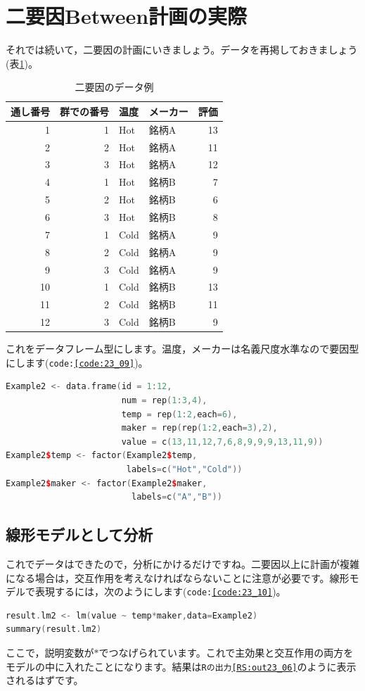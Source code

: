 \documentclass{ltjbook}
\begin{document}
\section{二要因Between計画の実際}
それでは続いて，二要因の計画にいきましょう。データを再掲しておきましょう(表\ref{tbl::23_02})。
\begin{table}[ht]
	\centering
	\caption{二要因のデータ例}
	\begin{tabular}{rrllr}
		\hline
		通し番号 & 群での番号 & 温度   & メーカー & 評価 \\
		\hline
		1    & 1     & Hot  & 銘柄A  & 13 \\
		2    & 2     & Hot  & 銘柄A  & 11 \\
		3    & 3     & Hot  & 銘柄A  & 12 \\
		4    & 1     & Hot  & 銘柄B  & 7  \\
		5    & 2     & Hot  & 銘柄B  & 6  \\
		6    & 3     & Hot  & 銘柄B  & 8  \\
		7    & 1     & Cold & 銘柄A  & 9  \\
		8    & 2     & Cold & 銘柄A  & 9  \\
		9    & 3     & Cold & 銘柄A  & 9  \\
		10   & 1     & Cold & 銘柄B  & 13 \\
		11   & 2     & Cold & 銘柄B  & 11 \\
		12   & 3     & Cold & 銘柄B  & 9  \\
		\hline
	\end{tabular}

	\label{tbl::23_02}
\end{table}
これをデータフレーム型にします。温度，メーカーは名義尺度水準なので要因型にします(\texttt{code:\ref{code:23_09}})。
\begin{lstlisting}[language=c++,label={code:23_09},caption={データフレームにする}]
Example2 <- data.frame(id = 1:12,
                       num = rep(1:3,4),
                       temp = rep(1:2,each=6),
                       maker = rep(rep(1:2,each=3),2),
                       value = c(13,11,12,7,6,8,9,9,9,13,11,9))
Example2$temp <- factor(Example2$temp,
                        labels=c("Hot","Cold"))
Example2$maker <- factor(Example2$maker,
                         labels=c("A","B"))
\end{lstlisting}
\subsection{線形モデルとして分析}
これでデータはできたので，分析にかけるだけですね。二要因以上に計画が複雑になる場合は，交互作用を考えなければならないことに注意が必要です。線形モデルで表現するには，次のようにします(\texttt{code:\ref{code:23_10}})。
\begin{lstlisting}[language=c++,label={code:23_10},caption={線形モデルとして実行}]
result.lm2 <- lm(value ~ temp*maker,data=Example2)
summary(result.lm2)
\end{lstlisting}
ここで，説明変数が$\ast$でつなげられています。これで主効果と交互作用の両方をモデルの中に入れたことになります。結果は\texttt{Rの出力\ref{RS:out23_06}}のように表示されるはずです。
\end{document}
